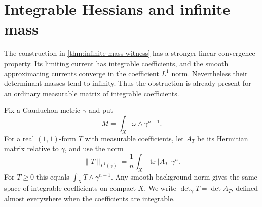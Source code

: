 \section{Integrable Hessians and infinite mass}
\label{sec:integrable-infinite-mass}

The construction in \cref{thm:infinite-mass-witness} has a stronger linear convergence property. Its limiting current has integrable coefficients, and the smooth approximating currents converge in the coefficient $L^1$ norm. Nevertheless their determinant masses tend to infinity. Thus the obstruction is already present for an ordinary measurable matrix of integrable coefficients.

Fix a Gauduchon metric $\gamma$ and put
\[
 M=\int_X\omega\wedge\gamma^{n-1}.
\]
For a real $(1,1)$-form $T$ with measurable coefficients, let $A_T$ be its Hermitian matrix relative to $\gamma$, and use the norm
\[
 \|T\|_{L^1(\gamma)}
 =\frac1n\int_X\operatorname{tr}|A_T|\,\gamma^n.
\]
For $T\geq0$ this equals $\int_XT\wedge\gamma^{n-1}$. Any smooth background norm gives the same space of integrable coefficients on compact $X$. We write $\det_\gamma T=\det A_T$, defined almost everywhere when the coefficients are integrable.

